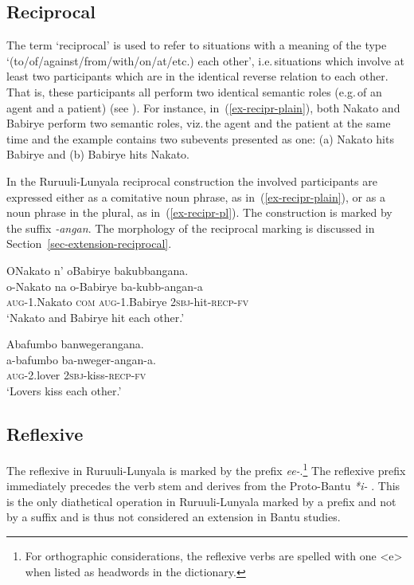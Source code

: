 \subsection{Reciprocal}\label{sec-reciprocal}
The term `reciprocal' is used to refer to situations with a meaning of the type ‘(to/of/against/from/with/on/at/etc.) each other’, i.e.\,situations which involve at least two participants which are in the identical reverse relation to each other. 
That is, these participants  all perform two identical semantic roles (e.g.\,of an agent and a patient) (see \citealt[6–7]{Nedjalkov2007Overview}). 
For instance, in~(\ref{ex-recipr-plain}), both Nakato and Babirye perform two semantic roles, viz.\,the agent and the patient at the same time and the example contains two subevents presented as one: 
(a) Nakato hits Babirye and (b) Babirye hits Nakato. 

In the Ru\-ruu\-li\hyp{}Lu\-nya\-la reciprocal construction the involved participants are expressed either as a comitative noun phrase, as in~(\ref{ex-recipr-plain}), or as a noun phrase in the plural, as in~(\ref{ex-recipr-pl}). 
The construction is marked by the suffix \emph{-angan}.
The morphology of the reciprocal marking is discussed in Section~\ref{sec-extension-reciprocal}.

\ea \label{ex-recipr-plain}
	\glll ONakato n’ oBabirye  bakubbangana.\\
	  o-Nakato na o-Babirye ba-kubb-angan-a\\
		\textsc{aug}-1.Nakato \textsc{com} \textsc{aug}-1.Babirye \textsc{2sbj}-hit-\textsc{recp}-\textsc{fv}\\
\glt ‘Nakato and Babirye hit each other.'
\z

\ea \label{ex-recipr-pl}
	\glll Abafumbo banwegerangana.\\
	  a-bafumbo ba-nweger-angan-a.\\
		\textsc{aug}-2.lover \textsc{2sbj}-kiss-\textsc{recp}-\textsc{fv}\\
\glt ‘Lovers kiss each other.'
\z

\subsection{Reflexive}\label{sec-reflexive}

The reflexive in Ru\-ruu\-li\hyp{}Lu\-nya\-la is marked by the prefix \mbox{\emph{ee-}}.\footnote{For orthographic considerations, the reflexive verbs are spelled with one <e> when listed as headwords in the dictionary.} 
The reflexive prefix immediately precedes the verb stem and derives from the Proto-Bantu \emph{*i-} \citep[109–110]{Meeussen1967Bantu}. 
This is the only diathetical operation in Ru\-ruu\-li\hyp{}Lu\-nya\-la marked by a prefix and not by a suffix and is thus not considered an extension in Bantu studies. 

